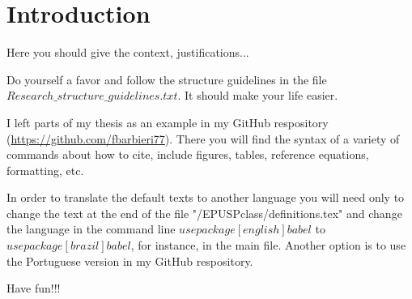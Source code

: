\chapter{Introduction} \label{chap:intro}
\pagestyle{fancyplain}


Here you should give the context, justifications...

Do yourself a favor and follow the structure guidelines in the file $Research\_structure\_guidelines.txt$.
It should make your life easier.

I left parts of my thesis as an example in my GitHub respository (\url{https://github.com/fbarbieri77}).
There you will find the syntax of a variety of commands about how to cite, include figures, tables, reference equations, formatting, etc.

In order to translate the default texts to another language you will need only to change the text at the end of the file "/EPUSPclass/definitions.tex" and change the language in the command line $usepackage[english]{babel}$ to $usepackage[brazil]{babel}$, for instance, in the main file.
Another option is to use the Portuguese version in my GitHub respository.

Have fun!!!
